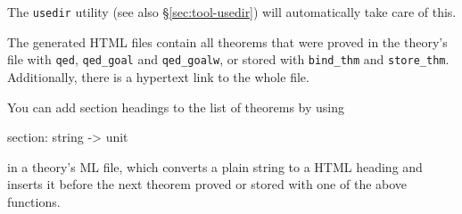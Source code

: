 The \texttt{usedir} utility (see also \S\ref{sec:tool-usedir}) will
automatically take care of this.

\medskip The generated HTML files contain all theorems that were
proved in the theory's \ML{} file with {\tt qed}, {\tt qed_goal} and
{\tt qed_goalw}, or stored with {\tt bind_thm} and {\tt store_thm}.
Additionally, there is a hypertext link to the whole \ML{} file.

You can add section headings to the list of theorems by using

\begin{ttbox}
section: string -> unit
\end{ttbox}

in a theory's ML file, which converts a plain string to a HTML heading
and inserts it before the next theorem proved or stored with one of
the above functions.


%
%
%
%
%


